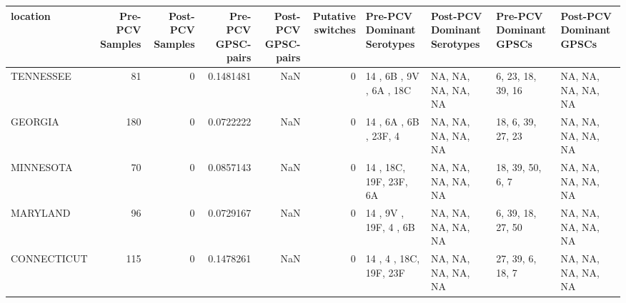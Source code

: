 
\begin{tabular}{l|r|r|r|r|r|l|l|l|l}
\hline
location & Pre-PCV Samples & Post-PCV Samples & Pre-PCV GPSC-pairs & Post-PCV GPSC-pairs & Putative switches & Pre-PCV Dominant Serotypes & Post-PCV Dominant Serotypes & Pre-PCV Dominant GPSCs & Post-PCV Dominant GPSCs\\
\hline
TENNESSEE & 81 & 0 & 0.1481481 & NaN & 0 & 14 , 6B , 9V , 6A , 18C & NA, NA, NA, NA, NA & 6, 23, 18, 39, 16 & NA, NA, NA, NA, NA\\
\hline
GEORGIA & 180 & 0 & 0.0722222 & NaN & 0 & 14 , 6A , 6B , 23F, 4 & NA, NA, NA, NA, NA & 18, 6, 39, 27, 23 & NA, NA, NA, NA, NA\\
\hline
MINNESOTA & 70 & 0 & 0.0857143 & NaN & 0 & 14 , 18C, 19F, 23F, 6A & NA, NA, NA, NA, NA & 18, 39, 50, 6, 7 & NA, NA, NA, NA, NA\\
\hline
MARYLAND & 96 & 0 & 0.0729167 & NaN & 0 & 14 , 9V , 19F, 4  , 6B & NA, NA, NA, NA, NA & 6, 39, 18, 27, 50 & NA, NA, NA, NA, NA\\
\hline
CONNECTICUT & 115 & 0 & 0.1478261 & NaN & 0 & 14 , 4  , 18C, 19F, 23F & NA, NA, NA, NA, NA & 27, 39, 6, 18, 7 & NA, NA, NA, NA, NA\\
\hline
\end{tabular}
